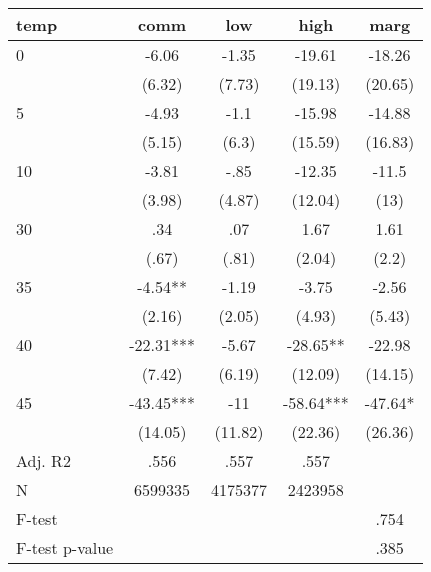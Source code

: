 \documentclass[]{article}
\begin{document}
\begin{tabular}{lcccc} \hline
temp & comm & low & high & marg \\ \hline
0 & -6.06 & -1.35 & -19.61 & -18.26 \\
 & (6.32) & (7.73) & (19.13) & (20.65) \\
5 & -4.93 & -1.1 & -15.98 & -14.88 \\
 & (5.15) & (6.3) & (15.59) & (16.83) \\
10 & -3.81 & -.85 & -12.35 & -11.5 \\
 & (3.98) & (4.87) & (12.04) & (13) \\
30 & .34 & .07 & 1.67 & 1.61 \\
 & (.67) & (.81) & (2.04) & (2.2) \\
35 & -4.54** & -1.19 & -3.75 & -2.56 \\
 & (2.16) & (2.05) & (4.93) & (5.43) \\
40 & -22.31*** & -5.67 & -28.65** & -22.98 \\
 & (7.42) & (6.19) & (12.09) & (14.15) \\
45 & -43.45*** & -11 & -58.64*** & -47.64* \\
 & (14.05) & (11.82) & (22.36) & (26.36) \\
\hline Adj. R2 & .556 & .557 & .557 &  \\
N & 6599335 & 4175377 & 2423958 &  \\
F-test &  &  &  & .754 \\
 F-test p-value &  &  &  & .385 \\ \hline
\end{tabular}
\end{document}
